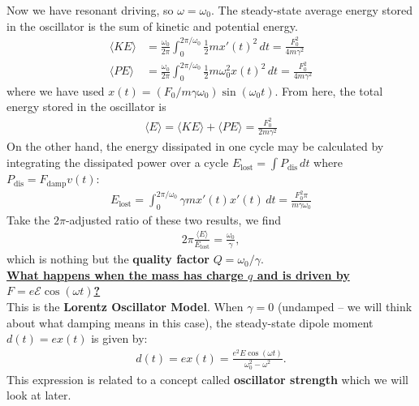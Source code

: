 \documentclass{book}
\theoremstyle{definition}
\newcommand{\f}[2]{\frac{#1}{#2}}
\begin{document}
Now we have resonant driving, so $\omega = \omega_0$. The steady-state average energy stored in the oscillator is the sum of kinetic and potential energy. 
\begin{align*}
\langle KE\rangle &= \f{\omega_0}{2\pi} \int_0^{2\pi/\omega_0} \f{1}{2}m x'(t)^2\,dt=   \f{F_0^2 }{4m\gamma^2}\\
\langle PE \rangle &= \f{\omega_0}{2\pi}\int_0^{2\pi/\omega_0} \f{1}{2}m \omega_0^2 x(t)^2\,dt  = \f{F_0^2}{4m\gamma^2}
\end{align*}
where we have used $x(t) = (F_0/m\gamma \omega_0) \sin(\omega_0 t)$. From here, the total energy stored in the oscillator is 
\begin{align*}
\boxed{\langle E \rangle = \langle KE \rangle + \langle PE \rangle = \f{F_0^2}{2m\gamma^2}}
\end{align*}
On the other hand, the energy dissipated in one cycle may be calculated by integrating the dissipated power over a cycle $E_\text{lost} = \int P_\text{dis}\,dt$ where $P_\text{dis} = F_\text{damp} v(t)$: 
\begin{align*}
\boxed{E_\text{lost} = \int_0^{2\pi/\omega_0} \gamma m x'(t) x'(t)\,dt = \f{F_0^2 \pi}{m\gamma \omega_0}}
\end{align*}
Take the $2\pi$-adjusted ratio of these two results, we find 
\begin{align*}
2\pi \f{\langle E \rangle}{E_\text{lost}} = \f{\omega_0}{\gamma},
\end{align*}
which is nothing but the \textbf{quality factor} $\boxed{Q = \omega_0 / \gamma}$.\\










\noindent \textbf{\underline{What happens when the mass has charge $q$ and is driven by $F = e\mathcal{E}\cos(\omega t)$?}}\\


This is the \textbf{Lorentz Oscillator Model}. When $\gamma = 0$ (undamped -- we will think about what damping means in this case), the steady-state dipole moment $d(t) = ex(t)$ is given by:
\begin{align*}
d(t) = ex(t) = \f{e^2 E\cos(\omega t)}{\omega_0^2 - \omega^2}.
\end{align*}
This expression is related to a concept called \textbf{oscillator strength} which we will look at later. \\
\end{document}
